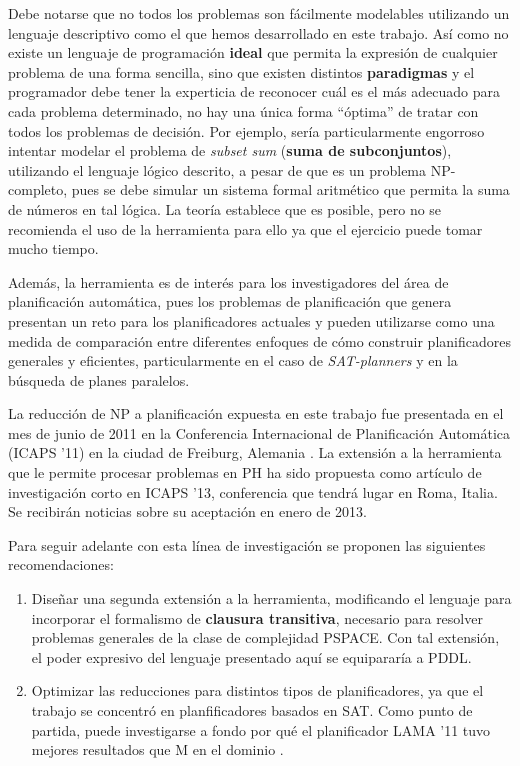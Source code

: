 Debe notarse que no todos los problemas son fácilmente modelables utilizando un
lenguaje descriptivo como el que hemos desarrollado en este trabajo. Así como
no existe un lenguaje de programación \textbf{ideal} que permita la expresión
de cualquier problema de una forma sencilla, sino que existen distintos
\textbf{paradigmas} y el programador debe tener la experticia de reconocer
cuál es el más adecuado para cada problema determinado, no hay una única forma
``óptima'' de tratar con todos los problemas de decisión.
Por ejemplo, sería particularmente engorroso intentar
modelar el problema de \textit{subset sum} (\textbf{suma de subconjuntos}),
utilizando el lenguaje lógico descrito, a pesar de que es un problema
NP-completo, pues se debe simular un sistema formal
aritmético que permita la suma de números en tal lógica. La teoría establece
que es posible, pero no se recomienda el uso de la herramienta para ello ya que
el ejercicio puede tomar mucho tiempo.

Además, la herramienta es de interés para los investigadores del área de
planificación automática, pues los problemas de planificación que genera
presentan un reto para los planificadores actuales y pueden utilizarse como una
medida de comparación entre diferentes enfoques de cómo construir planificadores
generales y eficientes, particularmente en el caso de \textit{SAT-planners} y
en la búsqueda de planes paralelos.

La reducción de NP a planificación expuesta en este trabajo fue presentada en el mes de junio
de 2011 en la Conferencia Internacional de
Planificación Automática (ICAPS '11) en la ciudad de Freiburg, Alemania
\citep{porco:npreductions}.
La extensión a la herramienta que le permite procesar problemas en PH ha sido
propuesta como artículo de investigación corto en ICAPS '13, conferencia que
tendrá lugar en Roma, Italia. Se recibirán noticias sobre su aceptación en
enero de 2013.

Para seguir adelante con esta línea de investigación se proponen las siguientes
recomendaciones:

\begin{enumerate}[--]
\item Diseñar una segunda extensión a la herramienta, modificando el lenguaje
para incorporar el formalismo de \textbf{clausura transitiva}, necesario para
resolver problemas generales de la clase de complejidad PSPACE. Con tal
extensión, el poder expresivo del lenguaje presentado aquí se equipararía a
PDDL.
\item Optimizar las reducciones para distintos tipos de planificadores, ya que
el trabajo se concentró en planfificadores basados en SAT. Como punto de
partida, puede investigarse a fondo por qué el planificador LAMA '11 tuvo
mejores resultados que M en el dominio \coCOL.
\end{enumerate}
